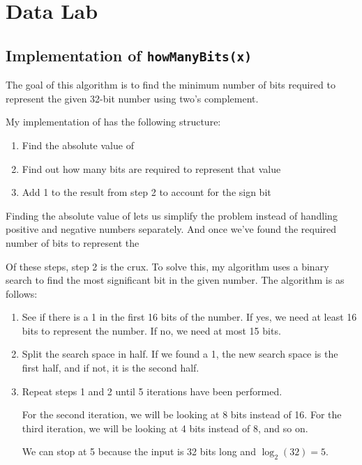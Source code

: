 \section{Data Lab}

\subsection{Implementation of \texttt{howManyBits(x)}}

The goal of this algorithm is to find the minimum number of bits required to represent the given 32-bit number using two's complement.

My implementation of  has the following structure:

\begin{enumerate}
  \item Find the absolute value of 
  \item Find out how many bits are required to represent that value
  \item Add 1 to the result from step 2 to account for the sign bit
\end{enumerate}

Finding the absolute value of  lets us simplify the problem instead of handling positive and negative numbers separately. And once we've found the required number of bits to represent the 

Of these steps, step 2 is the crux. To solve this, my algorithm uses a binary search to find the most significant bit in the given number. The algorithm is as follows:

\begin{enumerate}
  \item See if there is a 1 in the first 16 bits of the number. If yes, we need at least 16 bits to represent the number. If no, we need at most 15 bits.
  \item Split the search space in half. If we found a 1, the new search space is the first half, and if not, it is the second half.
  \item Repeat steps 1 and 2 until 5 iterations have been performed.

    For the second iteration, we will be looking at 8 bits instead of 16. For the third iteration, we will be looking at 4 bits instead of 8, and so on.

    We can stop at 5 because the input is 32 bits long and $\log_2(32) = 5$.
\end{enumerate}

